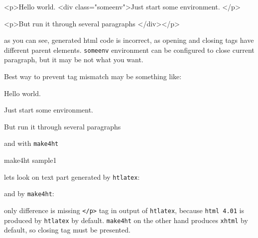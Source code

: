 \begin{htmlsource}
<p>Hello world.
<div class="someenv">Just start some environment.
</p>

<p>But run it through several paragraphs
</div></p>
\end{htmlsource}

as you can see, generated html code is incorrect, as opening and closing
 tags have different parent elements. \texttt{someenv} environment can
be configured to close current paragraph, but it may be not what you
want.

Best way to prevent tag mismatch may be something like:

\begin{texsource}
Hello world.
\begin{someenv}
Just start some environment.
\end{someenv}

\begin{someenv}
But run it through several paragraphs
\end{someenv}
\end{texsource}

and with \texttt{make4ht}

\begin{shellcommand}
make4ht sample1
\end{shellcommand}

lets look on text part generated by \texttt{htlatex}:


and by \texttt{make4ht}:


only difference is missing \texttt{\textless{}/p\textgreater{}} tag in
output of \texttt{htlatex}, because \texttt{html\ 4.01} is produced by
\texttt{htlatex} by default. \texttt{make4ht} on the other hand produces
\texttt{xhtml} by default, so closing tag must be presented.

